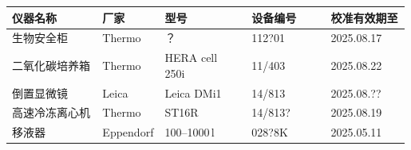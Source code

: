 \documentclass[UTF8,10pt,a4paper,fontset=fandol]{ctexart}
\newcommand{\fieldvalue}[1]{#1}
\newcommand{\handwritten}[1]{#1}
\begin{document}
\begin{center}
\small
\begin{tabular}{|p{0.23\linewidth}|p{0.14\linewidth}|p{0.22\linewidth}|p{0.20\linewidth}|p{0.20\linewidth}|}
\hline
仪器名称 & 厂家 & 型号 & 设备编号 & 校准有效期至 \\ \hline
生物安全柜 & 
\fieldvalue{Thermo} &
\fieldvalue{\handwritten{？}} &
\fieldvalue{\handwritten{112?01}} &
\fieldvalue{\handwritten{2025.08.17}} \\ \hline
二氧化碳培养箱 &
\fieldvalue{Thermo} &
\fieldvalue{HERA cell 250i} &
\fieldvalue{\handwritten{11/403}} &
\fieldvalue{\handwritten{2025.08.22}} \\ \hline
倒置显微镜 &
\fieldvalue{Leica} &
\fieldvalue{Leica DMi1} &
\fieldvalue{\handwritten{14/813}} &
\fieldvalue{\handwritten{2025.08.??}} \\ \hline
高速冷冻离心机 &
\fieldvalue{Thermo} &
\fieldvalue{ST16R} &
\fieldvalue{\handwritten{14/813?}} &
\fieldvalue{\handwritten{2025.08.19}} \\ \hline
移液器 &
\fieldvalue{Eppendorf} &
\fieldvalue{\handwritten{100--1000\,\textmu l}} &
\fieldvalue{\handwritten{028?8K}} &
\fieldvalue{\handwritten{2025.05.11}} \\ \hline
\end{tabular}
\end{center}
\end{document}
